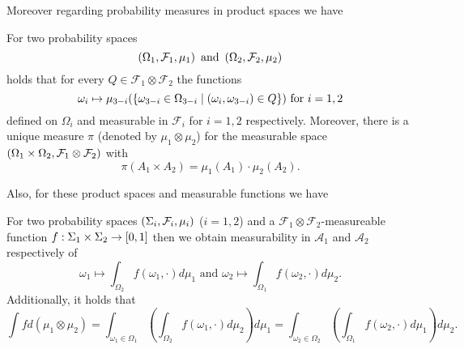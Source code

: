 Moreover regarding probability measures in product spaces we have
\begin{lemma}
  \cite[Lemma 23.2, Theorem 23.3]{Bauer}
  For two probability spaces 
  \begin{equation*}
    \left(\Omega_{1}, \mathcal{F}_{1}, \mu_{1}\right)\text{ and }
    \left(\Omega_{2}, \mathcal{F}_{2}, \mu_{2}\right)
  \end{equation*}
  holds that for every $Q\in\mathcal{F}_{1}\otimes\mathcal{F}_{2}$ the 
  functions
  \begin{equation*}
    \omega_{i}\mapsto\mu_{3-i}(\left\{\omega_{3-i}\in\Omega_{3-i}\mid
      \left(\omega_{i}, \omega_{3-i}\right)\in Q\right\})
    \text{ for }i = 1,2
  \end{equation*}
  defined on $\Omega_{i}$ and measurable in $\mathcal{F}_{i}$ for $i = 1,2$
  respectively. Moreover, there is a unique measure $\pi$ (denoted by 
  $\mu_{1}\otimes\mu_{2}$) for the measurable space 
  $\left(\Omega_{1}\times\Omega_{2}, \mathcal{F}_{1}\otimes\mathcal{F}_{2}\right)$ 
  with 
  \begin{equation*}
    \pi(A_{1}\times A_{2}) = \mu_{1}(A_{1})\cdot\mu_{2}(A_{2}).
  \end{equation*}
\end{lemma} 
Also, for these product spaces and measurable functions we have
\begin{theorem}
  \cite[Theorem 23.6]{Bauer}
  For two probability spaces $\left(\Sigma_{i}, \mathcal{F}_{i}, \mu_{i}\right)$ 
  ($i = 1,2$) and a $\mathcal{F}_{1}\otimes\mathcal{F}_{2}$-measureable 
  function $f:\Sigma_{1}\times\Sigma_{2}\rightarrow\left[0,1\right]$ then
  we obtain measurability in $\mathcal{A}_{1}$ and $\mathcal{A}_{2}$ 
  respectively of
  \begin{equation*}
    \omega_{1}\mapsto\int_{\Omega_{2}} f(\omega_{1},\cdot)d\mu_{1}
    \text{ and }
    \omega_{2}\mapsto\int_{\Omega_{1}} f(\omega_{2},\cdot)d\mu_{2}.
  \end{equation*}
  Additionally, it holds that
  \begin{equation*}
    \int f d(\mu_{1}\otimes\mu_{2}) 
    = \int_{\omega_{1}\in\Omega_{1}}(\int_{\Omega_{2}} f(\omega_{1},\cdot)
      d\mu_{2})d\mu_{1}
    = \int_{\omega_{2}\in\Omega_{2}}(\int_{\Omega_{1}} f(\omega_{2},\cdot)
      d\mu_{1})d\mu_{2}.
  \end{equation*}
  \label{thm:tonelli}
\end{theorem}

